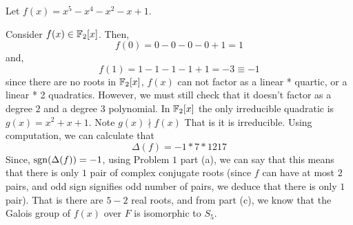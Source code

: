 \documentclass[12pt]{article}
\begin{document}
\begin{solution}
\begin{enumerate}
        
        
        Let $f(x) = x^5 - x^4 - x^2 - x +1$. 
        
        Consider $f(x) \in \mathbb F_2[x]$. Then, 
        \[f(0) = 0 - 0 - 0 - 0 + 1 = 1\]
        and, 
        \[f(1) = 1 - 1 - 1 - 1 + 1 = -3 \equiv -1\]
        since there are no roots in $\mathbb F_2[x]$, $f(x)$ can not factor as a linear * quartic, or a linear * 2 quadratics. However, we must still check that it doesn't factor as a degree $2$ and a degree $3$ polynomial. In $\mathbb F_2[x]$ the only irreducible quadratic is $g(x) = x^2 + x + 1$. Note $g(x) \nmid f(x)$
        That is it is irreducible. 
        Using computation, we can calculate that \[\Delta(f) = -1 * 7 * 1217\]
        Since, $\operatorname{sgn}(\Delta(f)) = -1$, using Problem $1$ part (a), we can say that this means that there is only $1$ pair of complex conjugate roots (since $f$ can have at most $2$ pairs, and odd sign signifies odd number of pairs, we deduce that there is only $1$ pair). That is there are $5-2$ real roots, and from part (c), we know that the Galois group of $f(x)$ over $F$ is isomorphic to $S_5$. 
        



\end{enumerate}
\end{solution}
\end{document}
